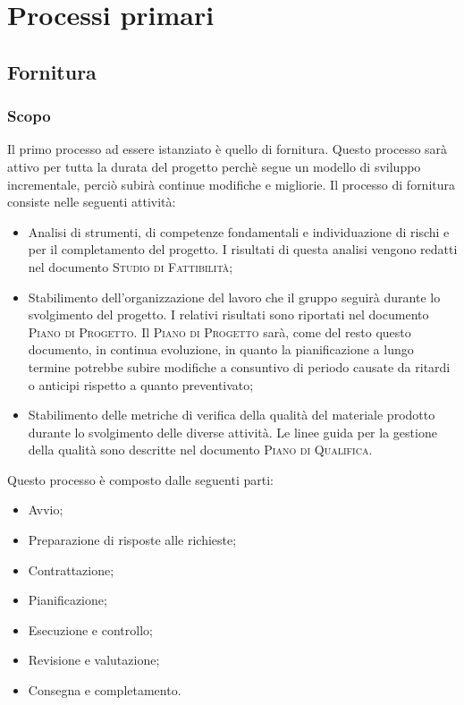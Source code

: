 \section{Processi primari}
\label{sec:processi_primari}

\subsection{Fornitura}

\subsubsection{Scopo}

Il primo processo ad essere istanziato è quello di fornitura. Questo processo sarà attivo per tutta la durata del
progetto perchè segue un modello di sviluppo incrementale, perciò subirà continue modifiche e migliorie.
Il processo di fornitura consiste nelle seguenti attività:
\begin{itemize}
    \item Analisi di strumenti, di competenze fondamentali e individuazione di rischi e  per il
    completamento del progetto. I risultati di questa analisi vengono redatti nel documento
    \textsc{Studio di Fattibilità};
    \item Stabilimento dell'organizzazione del lavoro che il gruppo seguirà durante lo svolgimento del progetto.
    I relativi risultati sono riportati nel documento \textsc{Piano di Progetto}.
    Il \textsc{Piano di Progetto} sarà, come del resto questo documento, in continua evoluzione, in quanto la
    pianificazione a lungo termine potrebbe subire modifiche a consuntivo di periodo causate da ritardi o anticipi
    rispetto a quanto preventivato;
    \item Stabilimento delle metriche di verifica della qualità del materiale prodotto durante lo svolgimento delle
    diverse attività. Le linee guida per la gestione della qualità sono descritte nel documento
    \textsc{Piano di Qualifica}.
\end{itemize}

Questo processo è composto dalle seguenti parti:
\begin{itemize}
    \item Avvio;
    \item Preparazione di risposte alle richieste;
    \item Contrattazione;
    \item Pianificazione;
    \item Esecuzione e controllo;
    \item Revisione e valutazione;
    \item Consegna e completamento.
\end{itemize}

